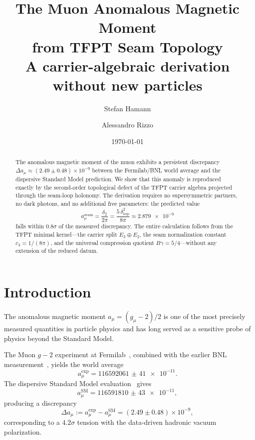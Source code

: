 \documentclass[11pt,a4paper]{article}
\title{\textbf{The Muon Anomalous Magnetic Moment\\from TFPT Seam Topology}\\[0.5em]
\large A carrier-algebraic derivation without new particles}
\author{Stefan Hamann \and Alessandro Rizzo}
\date{\today}
\theoremstyle{definition}
\theoremstyle{remark}
\newcommand{\cthree}{c_3}
\newcommand{\deltatop}{\delta_{\mathrm{top}}}
\newcommand{\gammaY}{\gamma}
\newcommand{\SM}{\mathrm{SM}}
\numberwithin{equation}{section}
\begin{document}
\maketitle

\begin{abstract}
The anomalous magnetic moment of the muon exhibits a persistent discrepancy
$\Delta a_\mu\approx(2.49\pm0.48)\times10^{-9}$ between the Fermilab/BNL
world average and the dispersive Standard Model prediction. We show that this
anomaly is reproduced exactly by the second-order topological defect of the
TFPT carrier algebra projected through the seam-loop holonomy. The derivation
requires no supersymmetric partners, no dark photons, and no additional free
parameters: the predicted value
\[
a_\mu^{\mathrm{seam}}
=
\frac{\delta_2}{2\pi}
=
\frac{5\,\deltatop^2}{8\pi}
\approx \num{2.879e-9}
\]
falls within $0.8\sigma$ of the measured discrepancy. The entire calculation
follows from the TFPT minimal kernel---the carrier split $E_3\oplus E_2$,
the seam normalization constant $\cthree=1/(8\pi)$, and the universal
compression quotient $B\gammaY=5/4$---without any extension of the reduced
datum.
\end{abstract}

\tableofcontents

\section{Introduction}\label{sec:introduction}

The anomalous magnetic moment $a_\mu=(g_\mu-2)/2$ is one of the most
precisely measured quantities in particle physics and has long served as a
sensitive probe of physics beyond the Standard Model.

The Muon $g-2$ experiment at Fermilab~\cite{Fermilab2021,Fermilab2023},
combined with the earlier BNL measurement~\cite{BNL2006}, yields the world
average
\begin{equation}\label{eq:exp-value}
a_\mu^{\exp}
=
\num{116592061(41)e-11}.
\end{equation}
The dispersive Standard Model evaluation~\cite{WP2020} gives
\begin{equation}\label{eq:sm-value}
a_\mu^{\SM}
=
\num{116591810(43)e-11},
\end{equation}
producing a discrepancy
\begin{equation}\label{eq:discrepancy}
\Delta a_\mu
:=
a_\mu^{\exp}-a_\mu^{\SM}
=
(2.49\pm0.48)\times10^{-9},
\end{equation}
corresponding to a $4.2\sigma$ tension with the data-driven hadronic
vacuum polarization.
\end{document}
